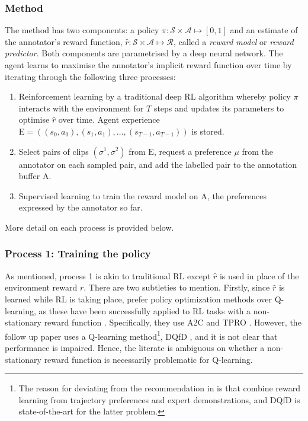 \documentclass[11pt, a4paper, bibliography=totoc]{report}
\newcommand{\rp}{\hat{r}}
\newcommand{\expbuff}{\mathrm{E}}
\newcommand{\annbuff}{\mathrm{A}}
\begin{document}
\subsubsection{Method}
The method has two components: a policy $ \pi : \mathcal{S} \times \mathcal{A} \mapsto [0,1] $ and an estimate of the annotator's reward function, $ \rp : \mathcal{S} \times \mathcal{A} \mapsto \mathcal{R} $, called a \textit{reward model} or \textit{reward predictor}. Both components are parametrised by a deep neural network. The agent learns to maximise the annotator's implicit reward function over time by iterating through the following three processes:
\begin{enumerate}
	\item Reinforcement learning by a traditional deep RL algorithm whereby policy $ \pi $ interacts with the environment for $ T $ steps and updates its parameters to optimise $ \rp $ over time. Agent experience $ \mathrm{E} = ((s_0, a_0), (s_1, a_1),\dots, (s_{T-1}, a_{T-1}) ) $ is stored.
	\item Select pairs of clips $ (\sigma^1, \sigma^2) $ from $ \expbuff $, request a preference $ \mu $ from the annotator on each sampled pair, and add the labelled pair to the annotation buffer $ \annbuff $.
	\item Supervised learning to train the reward model on $ \annbuff $, the preferences expressed by the annotator so far.
\end{enumerate}
More detail on each process is provided below.

\subsubsection{Process 1: Training the policy} %
As mentioned, process 1 is akin to traditional RL except $ \rp $ is used in place of the environment reward $ r $. There are two subtleties to mention. Firstly, since $ \rp $ is learned while RL is taking place, \cite{Christiano2017} prefer policy optimization methods over Q-learning, as these have been successfully applied to RL tasks with a non-stationary reward function \cite{Ho2016}. Specifically, they use A2C \cite{Mnih2016} and TPRO \cite{Schulman2015}. However, the follow up paper \cite{Ibarz2018} uses a Q-learning method\footnote{The reason for deviating from the recommendation in \cite{Christiano2017} is that \cite{Ibarz2018} combine reward learning from trajectory preferences and expert demonstrations, and DQfD is state-of-the-art for the latter problem.}, DQfD \cite{Hester2017}, and it is not clear that performance is impaired. Hence, the literate is ambiguous on whether a non-stationary reward function is necessarily problematic for Q-learning. %
\end{document}
